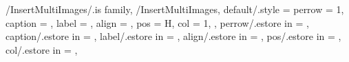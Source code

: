 \newcommand{\SetWidthOfImagePerRow}
{
  \ifthenelse{\equal{\GetMultiImagesPerRow}{1}}
  {
    \FPeval{\WidthOfImagePerRow}{1.0}
  } %
  {
    \provideboolean{WidthOfImagePerRowTmpIsDone}
    \setboolean{WidthOfImagePerRowTmpIsDone}{false}
    \FPeval{\TmpRemain}{
      clip((\GetMultiImageTotalValue) - (\GetMultiImageId))}
    \modulo{\GetMultiImageTotalValue}{\GetMultiImagesPerRow}
    \FPiflt{\TmpRemain}{\GetMultiImagesPerRow}
    \else
      \setboolean{WidthOfImagePerRowTmpIsDone}{true}
      \FPeval{
        \WidthOfImagePerRow}{
          clip(clip(1 / (\GetMultiImagesPerRow)) - 0.1)}
    \fi %
    \ifthenelse{\boolean{WidthOfImagePerRowTmpIsDone}}
    {}
    {
      \ifthenelse{\result = 0}
      {
        \FPeval{
          \WidthOfImagePerRow}{
            clip(clip(1 / (\GetMultiImagesPerRow)) - 0.1)}
      } %
      {
        \FPifeq{\TmpRemain}{0}
          \FPeval{\WidthOfImagePerRow}{1.0}
        \else
          \FPeval{
            \WidthOfImagePerRow}{
              clip(clip(1 / (\GetMultiImagesPerRow)) - 0.1)}
        \fi %
      } %
    } %
  } %
} %

\pgfkeys
{
  /InsertMultiImages/.is family, /InsertMultiImages,
  default/.style = 
  {
    perrow = 1,
    caption = \empty,
    label = \empty,
    align = \empty,
    pos = H,
    col = 1,
  },
  perrow/.estore in = \TmpMIValueImagePerRow,
  caption/.estore in = \TmpMIValueCaption,
  label/.estore in = \TmpMIValueLabel,
  align/.estore in = \TmpMIValueAlign,
  pos/.estore in = \TmpMIValuePosition,
  col/.estore in = \TmpMIValueColumn,
} %


